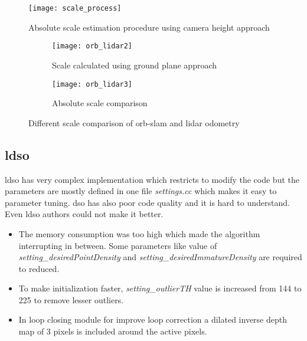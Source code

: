 \begin{figure}[H]
	\centering
	\texttt{[image: scale\_process]}
	\caption{Absolute scale estimation procedure using camera height approach \cite{ground}}
	\label{fig:scale_process}
\end{figure}
\begin{figure}[H]
	\begin{subfigure}{.5\textwidth}
		\centering
		\texttt{[image: orb\_lidar2]}
		\caption{Scale calculated using ground plane approach}
		\label{fig:orb_lidar2}
	\end{subfigure}%
	\begin{subfigure}{.5\textwidth}
		\centering
		\texttt{[image: orb\_lidar3]}
		\caption{Absolute scale comparison}
		\label{fig:orb_lidar3}
	\end{subfigure}
	\caption{Different scale comparison of \acrshort{orb}-\acrshort{slam} and \acrshort{lidar} odometry }
	\label{fig:plots}
\end{figure}

\subsection{\acrshort{ldso}}
\acrshort{ldso} has very complex implementation which restricts to modify the code but the parameters are mostly defined in one file \textit{settings.cc} which makes it easy to parameter tuning. \acrshort{dso} has also poor code quality and it is hard to understand. Even  \acrshort{ldso} authors could not make it better. 
\begin{itemize} 
	\item The memory consumption was too high which made the algorithm interrupting in between. Some parameters like value of \textit{setting\_desiredPointDensity} and \textit{setting\_desiredImmatureDensity} are required to reduced.
 	\item To make initialization faster, \textit{setting\_outlierTH} value is increased from 144 to 225 to remove lesser outliers.
	\item In loop closing module for improve loop correction a dilated inverse depth map of 3 pixels is included around the active pixels. 
\end{itemize}
